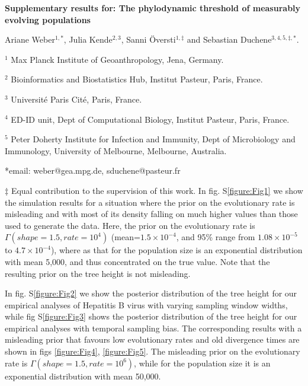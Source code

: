\documentclass[11pt]{article}
\begin{document}
\begin{flushright}

\end{flushright}
\begin{center}
	\begin{LARGE}
	\textbf{Supplementary results for: The phylodynamic threshold of measurably evolving populations}
	\end{LARGE}


Ariane Weber$^{1,*}$, Julia Kende$^{2, 3}$, Sanni Översti$^{1, \ddagger}$ and Sebastian Duchene$^{3,4, 5,\ddagger, *}$.
\end{center}

$^{1}$ Max Planck Institute of Geoanthropology, Jena, Germany.

$^{2}$ Bioinformatics and Biostatistics Hub, Institut Pasteur, Paris, France.

$^{3}$ Université Paris Cité, Paris, France.

$^{4}$ ED-ID unit, Dept of Computational Biology, Institut Pasteur, Paris, France.

$^{5}$ Peter Doherty Institute for Infection and Immunity, Dept of Microbiology and Immunology, University of Melbourne, Melbourne, Australia.
\newline

*email: weber@gea.mpg.de, sduchene@pasteur.fr

$\ddagger$ Equal contribution to the supervision of this work.
\newline
\newline
In fig. S\ref{figure:Fig1} we show the simulation results for a situation where the prior on the evolutionary rate is misleading and with most of its density falling on much higher values than those used to generate the data. Here, the prior on the evolutionary rate is $\Gamma(shape=1.5, rate=10^{4})$ (mean=$1.5\times 10^{-4}$, and 95\% range from $1.08 \times 10^{-5}$ to $4.7 \times 10^{-4}$), where as that for the population size is an exponential distribution with mean 5,000, and thus concentrated on the true value. Note that the resulting prior on the tree height is not misleading.

In fig. S\ref{figure:Fig2} we show the posterior distribution of the tree height for our empirical analyses of Hepatitis B virus with varying sampling window widths, while fig S\ref{figure:Fig3} shows the posterior distribution of the tree height for our empirical analyses with temporal sampling bias. The corresponding results with a misleading prior that favours low evolutionary rates and old divergence times are shown in figs \ref{figure:Fig4}, \ref{figure:Fig5}. The misleading prior on the evolutionary rate is $\Gamma(shape=1.5, rate=10^6)$, while for the population size it is an exponential distribution with mean 50,000.
\end{document}
